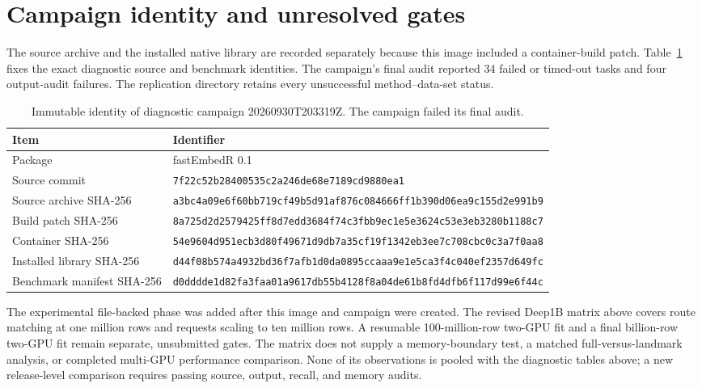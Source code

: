 \documentclass[article]{jss}
\begin{document}
\section{Campaign identity and unresolved gates}

The source archive and the installed native library are recorded
separately because this image included a container-build patch.
Table~\ref{tab:release-identity} fixes the exact diagnostic source and
benchmark identities. The campaign's final audit reported 34 failed
or timed-out tasks and four output-audit failures. The replication
directory retains every unsuccessful method--data-set status.

\begin{table}[htbp]
\centering
\scriptsize
\caption{Immutable identity of diagnostic campaign 20260930T203319Z.
  The campaign failed its final audit.}
\label{tab:release-identity}
\begin{tabular}{ll}
\toprule
Item & Identifier \\
\midrule
Package & fastEmbedR 0.1 \\
Source commit & \texttt{7f22c52b28400535c2a246de68e7189cd9880ea1} \\
Source archive SHA-256 &
  \texttt{a3bc4a09e6f60bb719cf49b5d91af876c084666ff1b390d06ea9c155d2e991b9} \\
Build patch SHA-256 &
  \texttt{8a725d2d2579425ff8d7edd3684f74c3fbb9ec1e5e3624c53e3eb3280b1188c7} \\
Container SHA-256 &
  \texttt{54e9604d951ecb3d80f49671d9db7a35cf19f1342eb3ee7c708cbc0c3a7f0aa8} \\
Installed library SHA-256 &
  \texttt{d44f08b574a4932bd36f7afb1d0da0895ccaaa9e1e5ca3f4c040ef2357d649fc} \\
Benchmark manifest SHA-256 &
  \texttt{d0dddde1d82fa3faa01a9617db55b4128f8a04de61b8fd4dfb6f117d99e6f44c} \\
\bottomrule
\end{tabular}
\end{table}

The experimental file-backed phase was added after this image and campaign
were created. The revised Deep1B matrix above covers route matching at
one million rows and requests scaling to ten million rows. A resumable
100-million-row two-GPU fit and a final billion-row two-GPU fit remain
separate, unsubmitted gates. The matrix does not supply a memory-boundary
test, a matched
full-versus-landmark analysis, or completed multi-GPU performance
comparison. None of its observations is pooled with the diagnostic tables
above; a new release-level comparison requires passing source, output,
recall, and memory audits.
\end{document}
